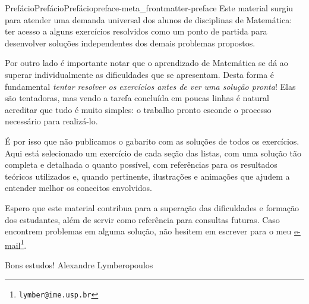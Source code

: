 \documentclass[oneside,10pt,]{book}
\numberwithin{equation}{section}
\begin{document}
\begin{preface}{Prefácio}{Prefácio}{}{Prefácio}{}{}{preface-meta_frontmatter-preface}
Este material surgiu para atender uma demanda universal dos alunos de disciplinas de Matemática: ter acesso a alguns exercícios resolvidos como um ponto de partida para desenvolver soluções independentes dos demais problemas propostos.%
\par
Por outro lado é importante notar que o aprendizado de Matemática se dá ao superar individualmente as dificuldades que se apresentam. Desta forma é fundamental \emph{tentar resolver os exercícios antes de ver uma solução pronta}! Elas são tentadoras, mas vendo a tarefa concluída em poucas linhas é natural acreditar que tudo é muito simples: o trabalho pronto esconde o processo necessário para realizá-lo.%
\par
É por isso que não publicamos o gabarito com as soluções de todos os exercícios. Aqui está selecionado um exercício de cada seção das listas, com uma solução tão completa e detalhada o quanto possível, com referências para os resultados teóricos utilizados e, quando pertinente, ilustrações e animações que ajudem a entender melhor os conceitos envolvidos.%
\par
Espero que este material contribua para a superação das dificuldades e formação dos estudantes, além de servir como referência para consultas futuras. Caso encontrem problemas em alguma solução, não hesitem em escrever para o meu \href{mailto:lymber@ime.usp.br?subject=MAT-2454 - Soluções de     Exercícios}{e-mail}\footnote{\nolinkurl{lymber@ime.usp.br}\label{fn-meta_frontmatter-preface-d-b}}.%
\par
Bons estudos!%
Alexandre Lymberopoulos\end{preface}
\setcounter{tocdepth}{1}
\renewcommand*\contentsname{Sumário}
\tableofcontents
\mainmatter
%
%
\typeout{************************************************}
\typeout{************************************************}
%
\end{document}
